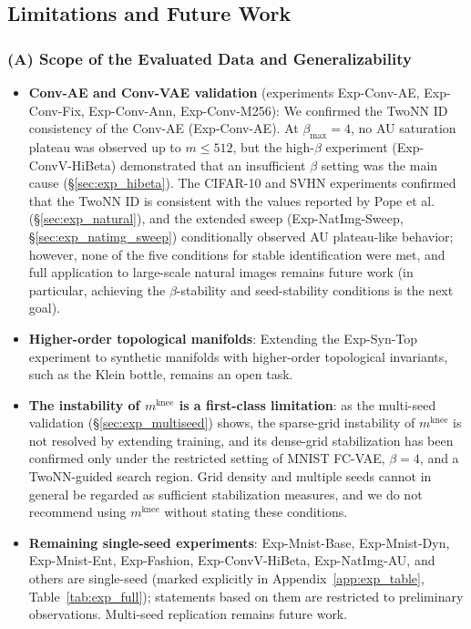 \documentclass[make,article,submit,pdftex,moreauthors]{Definitions/mdpi}
\newcommand{\mknee}{m^{\mathrm{knee}}}
\begin{document}
\subsection{Limitations and Future Work}\label{sec:disc_limitation}

\subsubsection*{(A) Scope of the Evaluated Data and Generalizability}

\begin{itemize}
  \item \textbf{Conv-AE and Conv-VAE validation} (experiments Exp-Conv-AE, Exp-Conv-Fix,
        Exp-Conv-Ann, Exp-Conv-M256):
        We confirmed the TwoNN ID consistency of the Conv-AE (Exp-Conv-AE).
        At $\beta_{\max}=4$, no AU saturation plateau was observed up to $m \leq 512$,
        but the high-$\beta$ experiment (Exp-ConvV-HiBeta) demonstrated that an
        insufficient $\beta$ setting was the main cause (\S\ref{sec:exp_hibeta}).
        The CIFAR-10 and SVHN experiments confirmed that the TwoNN ID is consistent with
        the values reported by Pope et al.~\cite{pope2021intrinsic}
        (\S\ref{sec:exp_natural}), and the extended sweep (Exp-NatImg-Sweep,
        \S\ref{sec:exp_natimg_sweep}) conditionally observed AU plateau-like behavior;
        however, none of the five conditions for stable identification were met, and
        full application to large-scale natural images remains future work (in
        particular, achieving the $\beta$-stability and seed-stability conditions is
        the next goal).
  \item \textbf{Higher-order topological manifolds}: Extending the Exp-Syn-Top
        experiment to synthetic manifolds with higher-order topological invariants,
        such as the Klein bottle, remains an open task.
  \item \textbf{The instability of $\mknee$ is a first-class limitation}:
        as the multi-seed validation (\S\ref{sec:exp_multiseed}) shows, the sparse-grid
        instability of $\mknee$ is not resolved by extending training, and its
        dense-grid stabilization has been confirmed only under the restricted setting
        of MNIST FC-VAE, $\beta=4$, and a TwoNN-guided search region.
        Grid density and multiple seeds cannot in general be regarded as sufficient
        stabilization measures, and we do not recommend using $\mknee$ without stating
        these conditions.
  \item \textbf{Remaining single-seed experiments}:
        Exp-Mnist-Base, Exp-Mnist-Dyn, Exp-Mnist-Ent, Exp-Fashion, Exp-ConvV-HiBeta,
        Exp-NatImg-AU, and others are single-seed (marked explicitly in
        Appendix~\ref{app:exp_table}, Table~\ref{tab:exp_full}); statements based on
        them are restricted to preliminary observations.
        Multi-seed replication remains future work.
\end{itemize}
\end{document}
